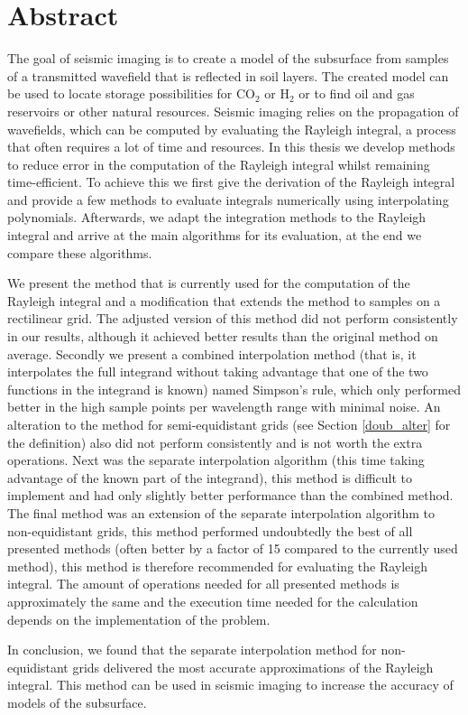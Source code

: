 \chapter*{Abstract}
The goal of seismic imaging is to create a model of the subsurface from samples of a transmitted wavefield that is reflected in soil layers.
The created model can be used to locate storage possibilities for CO$_2$ or H$_2$ or to find oil and gas reservoirs or other natural resources.
Seismic imaging relies on the propagation of wavefields, which can be computed by evaluating the Rayleigh integral, a process that often requires a lot of time and resources.
In this thesis we develop methods to reduce error in the computation of the Rayleigh integral whilst remaining time-efficient.
To achieve this we first give the derivation of the Rayleigh integral and provide a few methods to evaluate integrals numerically using interpolating polynomials.
Afterwards, we adapt the integration methods to the Rayleigh integral and arrive at the main algorithms for its evaluation, at the end we compare these algorithms.

We present the method that is currently used for the computation of the Rayleigh integral and a modification that extends the method to samples on a rectilinear grid.
The adjusted version of this method did not perform consistently in our results, although it achieved better results than the original method on average.
Secondly we present a combined interpolation method (that is, it interpolates the full integrand without taking advantage that one of the two functions in the integrand is known) named Simpson's rule, which only performed better in the high sample points per wavelength range with minimal noise.
An alteration to the method for semi-equidistant grids (see Section \ref{doub_alter} for the definition) also did not perform consistently and is not worth the extra operations.
Next was the separate interpolation algorithm (this time taking advantage of the known part of the integrand), this method is difficult to implement and had only slightly better performance than the combined method.
The final method was an extension of the separate interpolation algorithm to non-equidistant grids, this method performed undoubtedly the best of all presented methods (often better by a factor of 15 compared to the currently used method), this method is therefore recommended for evaluating the Rayleigh integral.
The amount of operations needed for all presented methods is approximately the same and the execution time needed for the calculation depends on the implementation of the problem.

In conclusion, we found that the separate interpolation method for non-equidistant grids delivered the most accurate approximations of the Rayleigh integral. This method can be used in seismic imaging to increase the accuracy of models of the subsurface.
